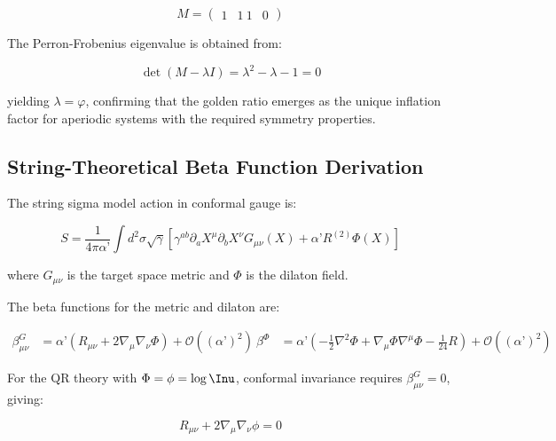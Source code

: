 \begin{equation}
M = \begin{pmatrix} 1 & 1 \ 1 & 0 \end{pmatrix}
\label{eq:inflation-matrix}
\end{equation}

The Perron-Frobenius eigenvalue is obtained from:

\begin{equation}
\det(M - \lambda I) = \lambda^2 - \lambda - 1 = 0
\label{eq:perron-frobenius-eigenvalue}
\end{equation}

yielding $\lambda = \varphi$, confirming that the golden ratio emerges as the unique inflation factor for aperiodic systems with the required symmetry properties.

\subsection{String-Theoretical Beta Function Derivation}
\label{subsec:beta-function-derivation}

The string sigma model action in conformal gauge is:

\begin{equation}
S = \frac{1}{4\pi\alpha’} \int d^2\sigma \sqrt{\gamma} \left[ \gamma^{ab} \partial_a X^\mu \partial_b X^\nu G_{\mu\nu}(X) + \alpha’ R^{(2)} \Phi(X) \right]
\label{eq:sigma-model-action}
\end{equation}

where $G_{\mu\nu}$ is the target space metric and $\Phi$ is the dilaton field.

The beta functions for the metric and dilaton are:

\begin{align}
\beta_{\mu\nu}^G &= \alpha’ \left( R_{\mu\nu} + 2\nabla_\mu \nabla_\nu \Phi \right) + \mathcal{O}((\alpha’)^2) \
\beta^\Phi &= \alpha’ \left( -\frac{1}{2}\nabla^2 \Phi + \nabla_\mu \Phi \nabla^\mu \Phi - \frac{1}{24}R \right) + \mathcal{O}((\alpha’)^2)
\label{eq:beta-functions}
\end{align}

For the QR theory with $\Phi = \phi = \log \Inu$, conformal invariance requires $\beta_{\mu\nu}^G = 0$, giving:

\begin{equation}
R_{\mu\nu} + 2\nabla_\mu \nabla_\nu \phi = 0
\label{eq:conformal-condition-derived}
\end{equation}


